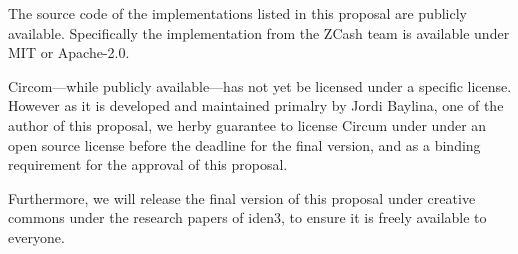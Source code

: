 The source code of the implementations listed in this proposal are publicly available.
Specifically the implementation from the ZCash team is available under MIT or Apache-2.0.

Circom---while publicly available---has not yet be licensed under a specific license.
However as it is developed and maintained primalry by Jordi Baylina, one of the author of this proposal,
we herby guarantee to license Circum under under an open source license before the deadline for the final version,
and as a binding requirement for the approval of this proposal.

Furthermore, we will release the final version of this proposal under creative commons
under the research papers of iden3, to ensure it is freely available to everyone.
